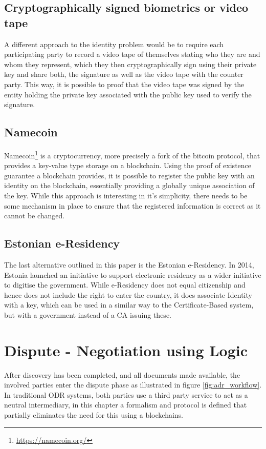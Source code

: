 \documentclass[12pt,msc,a4paper,oneside]{ucl_thesis}
\begin{document}
\section{Cryptographically signed biometrics or video tape}
A different approach to the identity problem would be to require each participating party to record a video tape of themselves stating who they are and whom they represent, which they then cryptographically sign using their private key and share both, the signature as well as the video tape with the counter party. This way, it is possible to proof that the video tape was signed by the entity holding the private key associated with the public key used to verify the signature. 

\section{Namecoin}
Namecoin\footnote{\url{https://namecoin.org/}} is a cryptocurrency, more precisely a fork of the bitcoin protocol, that provides a key-value type storage on a blockchain. Using the proof of existence guarantee a blockchain provides, it is possible to register the public key with an identity on the blockchain, essentially providing a globally unique association of the key. While this approach is interesting in it's simplicity, there needs to be some mechanism in place to ensure that the registered information is correct as it cannot be changed.

\section{Estonian e-Residency}
The last alternative outlined in this paper is the Estonian e-Residency. In 2014, Estonia launched an initiative to support electronic residency as a wider initiative to digitise the government. While e-Residency does not equal citizenship and hence does not include the right to enter the country, it does associate Identity with a key, which can be used in a similar way to the Certificate-Based system, but with a government instead of a CA issuing these. \cite{estonia:eResidency}

\chapter{Dispute - Negotiation using Logic} \label{chapter:dispute}
After discovery has been completed, and all documents made available, the involved parties enter the dispute phase as illustrated in figure \ref{fig:adr_workflow}. In traditional ODR systems, both parties use a third party service to act as a neutral intermediary, in this chapter a formalism and protocol is defined that partially eliminates the need for this using a blockchains.
\end{document}
